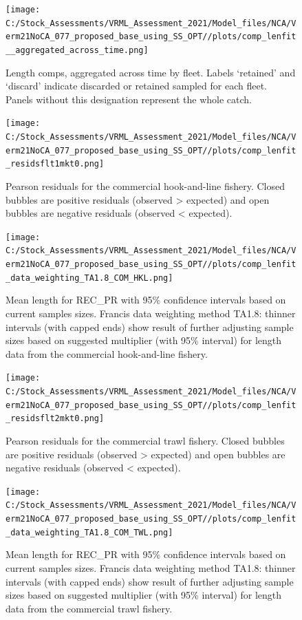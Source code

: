 \documentclass[
  english,
  a4paper,
]{article}
\begin{document}
\FloatBarrier

\FloatBarrier

\begin{figure}
\centering
\texttt{[image: C:/Stock\_Assessments/VRML\_Assessment\_2021/Model\_files/NCA/Verm21NoCA\_077\_proposed\_base\_using\_SS\_OPT//plots/comp\_lenfit\_\_aggregated\_across\_time.png]}
\caption{Length comps, aggregated across time by fleet.
Labels `retained' and `discard' indicate discarded or retained sampled for each fleet. Panels without this designation represent the whole catch.\label{fig:lenfits-all}}
\end{figure}

\FloatBarrier

\begin{figure}
\centering
\texttt{[image: C:/Stock\_Assessments/VRML\_Assessment\_2021/Model\_files/NCA/Verm21NoCA\_077\_proposed\_base\_using\_SS\_OPT//plots/comp\_lenfit\_residsflt1mkt0.png]}
\caption{Pearson residuals for the commercial hook-and-line fishery. Closed bubbles are positive residuals (observed \textgreater{} expected) and open bubbles are negative residuals (observed \textless{} expected).\label{fig:len-pearson-COM-HKL}}
\end{figure}

\begin{figure}
\centering
\texttt{[image: C:/Stock\_Assessments/VRML\_Assessment\_2021/Model\_files/NCA/Verm21NoCA\_077\_proposed\_base\_using\_SS\_OPT//plots/comp\_lenfit\_data\_weighting\_TA1.8\_COM\_HKL.png]}
\caption{Mean length for REC\_PR with 95\% confidence intervals based on current samples sizes. Francis data weighting method TA1.8: thinner intervals (with capped ends) show result of further adjusting sample sizes based on suggested multiplier (with 95\% interval) for length data from the commercial hook-and-line fishery.\label{fig:mean-len-fit-COM-HKL}}
\end{figure}

\begin{figure}
\centering
\texttt{[image: C:/Stock\_Assessments/VRML\_Assessment\_2021/Model\_files/NCA/Verm21NoCA\_077\_proposed\_base\_using\_SS\_OPT//plots/comp\_lenfit\_residsflt2mkt0.png]}
\caption{Pearson residuals for the commercial trawl fishery. Closed bubbles are positive residuals (observed \textgreater{} expected) and open bubbles are negative residuals (observed \textless{} expected).\label{fig:len-pearson-COM-TWL}}
\end{figure}

\begin{figure}
\centering
\texttt{[image: C:/Stock\_Assessments/VRML\_Assessment\_2021/Model\_files/NCA/Verm21NoCA\_077\_proposed\_base\_using\_SS\_OPT//plots/comp\_lenfit\_data\_weighting\_TA1.8\_COM\_TWL.png]}
\caption{Mean length for REC\_PR with 95\% confidence intervals based on current samples sizes. Francis data weighting method TA1.8: thinner intervals (with capped ends) show result of further adjusting sample sizes based on suggested multiplier (with 95\% interval) for length data from the commercial trawl fishery.\label{fig:mean-len-fit-COM-TWL}}
\end{figure}
\end{document}
